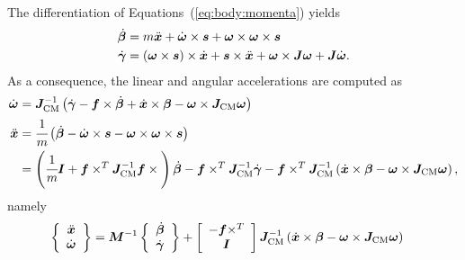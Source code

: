 \documentclass[10pt,dvips,fleqn,subeqn]{report}
\newcommand{\T}[1]{\bm{#1}}
\newcommand{\TT}[1]{\bm{#1}}
\begin{document}
The differentiation of Equations~(\ref{eq:body:momenta}) yields
\begin{subequations}
\begin{align}
	\dot{\T{\beta}}
	&=
	m \ddot{\T{x}}
	+
	\dot{\T{\omega}} \times \T{s}
	+
	\T{\omega} \times \T{\omega} \times \T{s}
	\\
	\dot{\T{\gamma}}
	&=
	\plbr{\T{\omega}\times \T{s}} \times \dot{\T{x}}
	+
	\T{s} \times \ddot{\T{x}}
	+
	\T{\omega} \times \TT{J} \T{\omega}
	+
	\TT{J} \dot{\T{\omega}} .
\end{align}
\end{subequations}
As a consequence, the linear and angular accelerations are computed as
\begin{align}
	\dot{\T{\omega}}
	&= \TT{J}_{\text{CM}}^{-1} \plbr{
		\dot{\T{\gamma}}
		- \T{f} \times \dot{\T{\beta}}
		+ \dot{\T{x}} \times \T{\beta}
		- \T{\omega} \times \TT{J}_{\text{CM}} \T{\omega}
	} \\
	\ddot{\T{x}}
	&= \cfrac{1}{m}\plbr{
		\dot{\T{\beta}}
		- \dot{\T{\omega}} \times \T{s}
		- \T{\omega} \times \T{\omega} \times \T{s}
	}
	\nonumber \\
	&= \plbr{
		\cfrac{1}{m} \TT{I}
		+
		\T{f}\times^T \TT{J}_\text{CM}^{-1} \T{f}\times{}
	} \dot{\T{\beta}}
	-
	\T{f}\times^T \TT{J}_\text{CM}^{-1} \dot{\T{\gamma}}
	-
	\T{f}\times^T \TT{J}_\text{CM}^{-1} \plbr{
		\dot{\T{x}}\times\T{\beta}
		- \T{\omega}\times\TT{J}_\text{CM} \T{\omega}
	}
	,
\end{align}
namely
\begin{align}
	\cubr{\cvvect{
		\ddot{\T{x}}
		\\
		\dot{\T{\omega}}
	}}
	&=
	\TT{M}^{-1} \cubr{\cvvect{
		\dot{\T{\beta}}
		\\
		\dot{\T{\gamma}}
	}}
	+
	\sqbr{\cvvect{
		- \T{f}\times^T
		\\
		\TT{I}
	}} \TT{J}_\text{CM}^{-1} \plbr{
		\dot{\T{x}}\times\T{\beta}
		-
		\T{\omega}\times\TT{J}_\text{CM} \T{\omega}
	}
\end{align}
\end{document}
